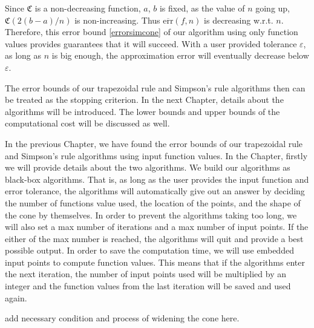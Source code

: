 \documentclass{iitthesis}
\DeclareMathOperator{\Var}{Var}
\theoremstyle{definition}
\theoremstyle{remark}
\begin{document}
Since $\mathfrak{C}$ is a non-decreasing function, $a$, $b$ is fixed, as the value of $n$ going up, $\mathfrak{C}(2(b-a)/n)$ is non-increasing. Thus $\overline{\text{err}}(f,n)$ is decreasing w.r.t. $n$. Therefore, this error bound \eqref{errorsimcone} of our algorithm using only function values provides guarantees that it will succeed. With a user provided tolerance $\varepsilon$, as long as $n$ is big enough, the approximation error will eventually decrease below $\varepsilon$.

The error bounds of our trapezoidal rule and Simpson's rule algorithms then can be treated as the stopping criterion. In the next Chapter, details about the algorithms will be introduced. The lower bounds and upper bounds of the computational cost will be discussed as well.

%




In the previous Chapter, we have found the error bounds of our trapezoidal rule and Simpson's rule algorithms using input function values. In the Chapter, firstly we will provide details about the two algorithms. We build our algorithms as black-box algorithms. That is, as long as the user provides the input function and error tolerance, the algorithms will automatically give out an answer by deciding the number of functions value used, the location of the points, and the shape of the cone by themselves. In order to prevent the algorithms taking too long, we will also set a max number of iterations and a max number of input points. If the either of the max number is reached, the algorithms will quit and provide a best possible output. In order to save the computation time, we will use embedded input points to compute function values. This means that if the algorithms enter the next iteration, the number of input points used will be multiplied by an integer and the function values from the last iteration will be saved and used again.

add necessary condition and process of widening the cone here.
\end{document}
